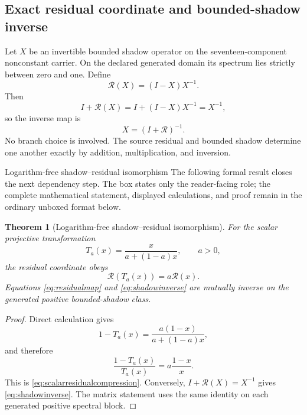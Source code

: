 \documentclass[11pt]{article}
\numberwithin{equation}{section}
\newtheorem{theorem}[definition]{Theorem}
\theoremstyle{remark}
\begin{document}
\subsection{Exact residual coordinate and bounded-shadow inverse}
Let $X$ be an invertible bounded shadow operator on the seventeen-component nonconstant carrier.  On the declared generated domain its spectrum lies strictly between zero and one.  Define
\begin{equation}
\mathcal R(X)=(I-X)X^{-1}.
\label{eq:residualmap}
\end{equation}
Then
\begin{equation}
I+\mathcal R(X)=I+(I-X)X^{-1}=X^{-1},
\end{equation}
so the inverse map is
\begin{equation}
X=(I+\mathcal R)^{-1}.
\label{eq:shadowinverse}
\end{equation}
No branch choice is involved.  The source residual and bounded shadow determine one another exactly by addition, multiplication, and inversion.

\begin{proofguide}{Logarithm-free shadow--residual isomorphism}
The following formal result closes the next dependency step. The box states only the reader-facing role; the complete mathematical statement, displayed calculations, and proof remain in the ordinary unboxed format below.
\end{proofguide}
\begin{theorem}[Logarithm-free shadow--residual isomorphism]
For the scalar projective transformation
\begin{equation}
T_a(x)=\frac{x}{a+(1-a)x},\qquad a>0,
\end{equation}
the residual coordinate obeys
\begin{equation}
\mathcal R(T_a(x))=a\mathcal R(x).
\label{eq:scalarresidualcompression}
\end{equation}
Equations \eqref{eq:residualmap} and \eqref{eq:shadowinverse} are mutually inverse on the generated positive bounded-shadow class.
\end{theorem}
\begin{proof}
Direct calculation gives
\begin{equation}
1-T_a(x)=\frac{a(1-x)}{a+(1-a)x},
\end{equation}
and therefore
\begin{equation}
\frac{1-T_a(x)}{T_a(x)}=a\frac{1-x}{x}.
\end{equation}
This is \eqref{eq:scalarresidualcompression}.  Conversely, $I+\mathcal R(X)=X^{-1}$ gives \eqref{eq:shadowinverse}.  The matrix statement uses the same identity on each generated positive spectral block.
\end{proof}
\end{document}
